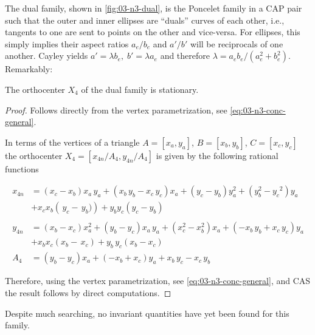 
The dual family, shown in \cref{fig:03-n3-dual}, is the Poncelet family in a CAP pair such that the outer and inner ellipses are ``duals'' curves of each other, i.e., tangents to one are sent to points on the other and vice-versa. For ellipses, this simply implies their aspect ratios $a_e/b_e$ and $a'/b'$ will be reciprocals of one another. Cayley yields $a'=\lambda b_e,\; b'=\lambda a_e$ and therefore $\lambda= a_e b_e/(a_e^2+b_e^2)$. Remarkably:

\begin{proposition}
The orthocenter $X_4$ of the dual family is stationary.
\end{proposition}

\begin{proof}
Follows directly from the vertex parametrization, see \cref{eq:03-n3-conc-general}.

In terms of the vertices of a triangle $A=[x_a,y_a]$, $B=[x_b,y_b]$, $C=[x_c,y_c]$ the orthocenter $X_4=[x_{4n}/A_4,y_{4n}/A_4]$ is given by the following rational functions 

\begin{align*}
    x_{4n}&=   \left(x_c-x_b\right) x_a\,y_a+ \left( 
 x_b\,y_b-x_c\,y_c \right) x_a+ \left( y_c-y_b \right) y_a^2+ \left( y_b^2-{y_c}^{2} \right) y_a\\
&+  x_cx_b\left( \,y_c- \,y_b)
 \right) +y_by_c( y_c-y_b) \\
 \\
 y_{4n}&=  \left(x_b-x_c\right) x_a^2+ \left( y_b-y_c \right) x_a\,y_a+ \left( x_c^2-x_b^2\right) x_a+ \left( -x_b\,y_b+x_c\,y_c \right) y_a\\
 &+x_b  x_c(x_b- \,x_c)+ y_b\,y_c(x_b-x_c) \\
A_4&= \left(y_b-y_c \right) x_a+ \left( -x_b+x_c\right) y_a+x_b\,y_c-x_c\,y_b
\end{align*}

Therefore, using  the vertex parametrization, see \cref{eq:03-n3-conc-general}, and CAS the result follows by direct computations.
\end{proof}

Despite much searching, no invariant quantities have yet been found for this family.
